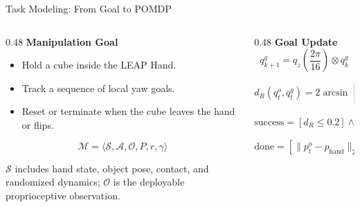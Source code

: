 \documentclass{beamer}
\begin{document}
\begin{frame}{Task Modeling: From Goal to POMDP}
    \small
    \vspace{0.8em}
    \begin{columns}[T,onlytextwidth]
        \begin{column}{0.48\textwidth}
            \textbf{\textcolor{maincolor}{Manipulation Goal}}
            \begin{itemize}
                \item Hold a cube inside the LEAP Hand.
                \item Track a sequence of local yaw goals.
                \item Reset or terminate when the cube leaves the hand or flips.
            \end{itemize}

            \vspace{0.2em}
            \[
                \mathcal{M}
                =
                \langle
                \mathcal{S},\mathcal{A},\mathcal{O},P,r,\gamma
                \rangle
            \]

            \scriptsize
            $\mathcal{S}$ includes hand state, object pose, contact, and randomized dynamics;
            $\mathcal{O}$ is the deployable proprioceptive observation.
        \end{column}
        \begin{column}{0.48\textwidth}
            \textbf{\textcolor{maincolor}{Goal Update}}
            \[
                q^g_{k+1}
                =
                q_z\!\left(\frac{2\pi}{16}\right)
                \otimes q^g_k
            \]

            \[
                d_R(q^o_t,q^g_t)
                =
                2\arcsin
                \left\|
                \operatorname{vec}(q^o_t \otimes (q^g_t)^{-1})
                \right\|_2
            \]

            \[
                \mathrm{success}
                =
                [d_R \le 0.2]\wedge
                [\|p^o_t-p_{\mathrm{hand}}\|_2 \le 0.025]
            \]

            \[
                \mathrm{done}
                =
                [\|p^o_t-p_{\mathrm{hand}}\|_2 \ge 0.07]\vee
                [\mathrm{timeout}]
            \]
        \end{column}
    \end{columns}
\end{frame}
\end{document}
